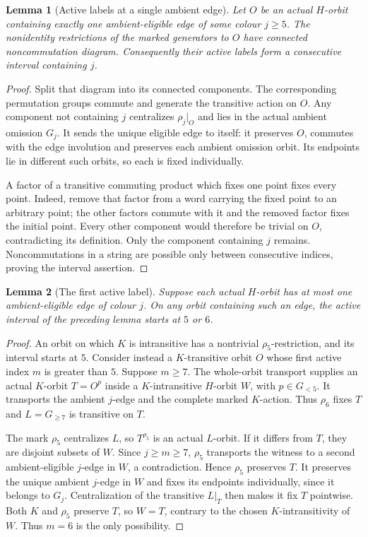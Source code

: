 \documentclass[11pt,a4paper]{article}
\newtheorem{lemma}{Lemma}
\begin{document}
\begin{lemma}[Active labels at a single ambient edge]
Let $O$ be an actual $H$-orbit containing exactly one
ambient-eligible edge of some colour $j\ge5$.
The nonidentity restrictions of the marked generators
to $O$ have connected noncommutation diagram.
Consequently their active labels form a consecutive
interval containing $j$.
\end{lemma}
\begin{proof}
Split that diagram into its connected components.
The corresponding permutation groups commute and
generate the transitive action on $O$. Any component
not containing $j$ centralizes $\rho_j|_O$ and lies
in the actual ambient omission $G_j$. It sends the
unique eligible edge to itself: it preserves $O$,
commutes with the edge involution and preserves
each ambient omission orbit. Its endpoints lie in
different such orbits, so each is fixed individually.

A factor of a transitive commuting product which
fixes one point fixes every point. Indeed, remove
that factor from a word carrying the fixed point
to an arbitrary point; the other factors commute
with it and the removed factor fixes the initial
point. Every other component would therefore be
trivial on $O$, contradicting its definition.
Only the component containing $j$ remains.
Noncommutations in a string are possible only
between consecutive indices, proving the interval
assertion.
\end{proof}

\begin{lemma}[The first active label]
Suppose each actual $H$-orbit has at most one
ambient-eligible edge of colour $j$. On any orbit
containing such an edge, the active interval of
the preceding lemma starts at $5$ or $6$.
\end{lemma}
\begin{proof}
An orbit on which $K$ is intransitive has a nontrivial
$\rho_5$-restriction, and its interval starts at $5$.
Consider instead a $K$-transitive orbit $O$ whose
first active index $m$ is greater than $5$.
Suppose $m\ge7$. The whole-orbit transport supplies
an actual $K$-orbit $T=O^p$ inside a $K$-intransitive
$H$-orbit $W$, with $p\in G_{<5}$. It transports
the ambient $j$-edge and the complete marked
$K$-action. Thus $\rho_6$ fixes $T$ and
$L=G_{\ge7}$ is transitive on $T$.

The mark $\rho_5$ centralizes $L$, so $T^{\rho_5}$
is an actual $L$-orbit. If it differs from $T$,
they are disjoint subsets of $W$. Since $j\ge m\ge7$,
$\rho_5$ transports the witness to a second
ambient-eligible $j$-edge in $W$, a contradiction.
Hence $\rho_5$ preserves $T$. It preserves the unique
ambient $j$-edge in $W$ and fixes its endpoints
individually, since it belongs to $G_j$. Centralization
of the transitive $L|_T$ then makes it fix $T$
pointwise. Both $K$ and $\rho_5$ preserve $T$, so
$W=T$, contrary to the chosen $K$-intransitivity
of $W$. Thus $m=6$ is the only possibility.
\end{proof}
\end{document}
